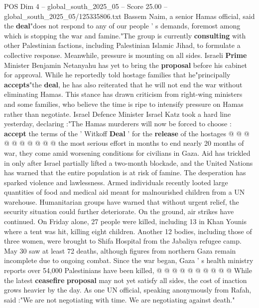 \begin{textsample}{POS Dim 4 – global\_south\_2025\_05 – Score 25.00 – global\_south\_2025\_05/125335806.txt}
Bassem Naim, a senior Hamas official, said the \textbf{deal}"does not respond to any of our people ' s demands, foremost among which is stopping the war and famine."The group is currently \textbf{consulting} with other Palestinian factions, including Palestinian Islamic Jihad, to formulate a collective response.
Meanwhile, pressure is mounting on all sides.
Israeli \textbf{Prime} Minister Benjamin Netanyahu has yet to bring the \textbf{proposal} before his cabinet for approval.
While he reportedly told hostage families that he"principally \textbf{accepts}"the \textbf{deal}, he has also reiterated that he will not end the war without eliminating Hamas.
This stance has drawn criticism from right-wing ministers and some families, who believe the time is ripe to intensify pressure on Hamas rather than negotiate.
Israel Defence Minister Israel Katz took a hard line yesterday, declaring :"The Hamas murderers will now be forced to choose : \textbf{accept} the terms of the ' Witkoff \textbf{Deal} ' for the \textbf{release} of the hostages @ @ @ @ @ @ @ @ @ @ the most serious effort in months to end nearly 20 months of war, they come amid worsening conditions for civilians in Gaza.
Aid has trickled in only after Israel partially lifted a two-month blockade, and the United Nations has warned that the entire population is at risk of famine.
The desperation has sparked violence and lawlessness.
Armed individuals recently looted large quantities of food and medical aid meant for malnourished children from a UN warehouse.
Humanitarian groups have warned that without urgent relief, the security situation could further deteriorate.
On the ground, air strikes have continued.
On Friday alone, 27 people were killed, including 13 in Khan Younis where a tent was hit, killing eight children.
Another 12 bodies, including those of three women, were brought to Shifa Hospital from the Jabaliya refugee camp.
May 30 saw at least 72 deaths, although figures from northern Gaza remain incomplete due to ongoing combat.
Since the war began, Gaza ' s health ministry reports over 54,000 Palestinians have been killed, @ @ @ @ @ @ @ @ @ @ While the latest \textbf{ceasefire} \textbf{proposal} may not yet satisfy all sides, the cost of inaction grows heavier by the day.
As one UN official, speaking anonymously from Rafah, said :"We are not negotiating with time.
We are negotiating against death."

\end{textsample}
